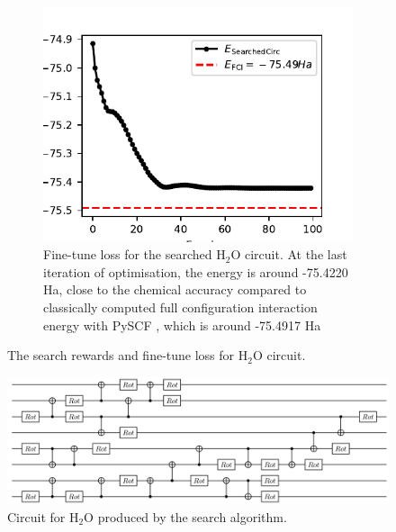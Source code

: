 \documentclass[a4paper,onecolumn,11pt]{quantumarticle}
\begin{document}
\begin{figure}[H]
\begin{subfigure}[t]{0.48\linewidth}
        \includegraphics[width=\linewidth]{Figures/fig_H2O_fine_tune_loss.pdf}
        \caption{Fine-tune loss for the searched $\text{H}_2\text{O}$ circuit. At the last iteration of optimisation, the energy is around -75.4220  Ha,  close to the chemical accuracy compared to classically computed full configuration interaction energy with PySCF \cite{Sun2018-nq, Sun2020-ej}, which is around -75.4917  Ha}
        \label{fig:h2o_finetune}
    \end{subfigure}
    \caption{The search rewards and fine-tune loss for $\text{H}_2\text{O}$ circuit.}\label{fig:h2o_search_finetune}
\end{figure}

\begin{figure}[H]
  \centering
 \includegraphics[width=0.9\linewidth]{Figures/fig_h2o_circ_quantikz.png}
  \caption{Circuit for $\text{H}_2\text{O}$ produced by the search algorithm.}
  \label{fig:h2o_circ}
\end{figure}
\end{document}
